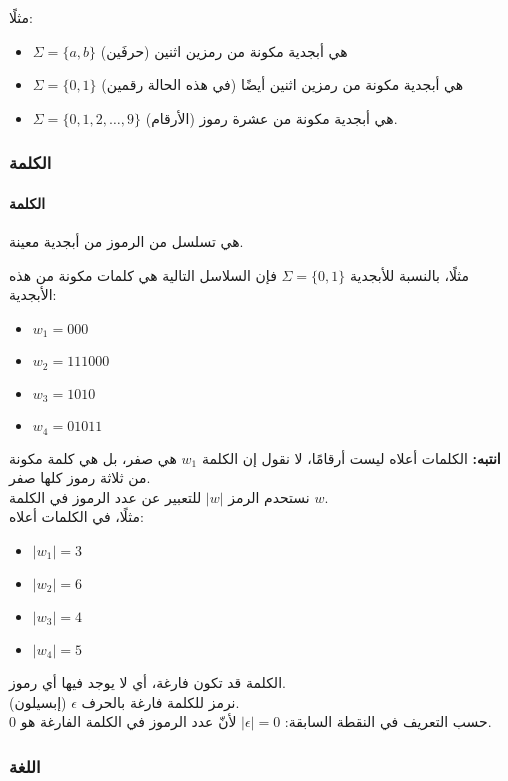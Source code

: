 \documentclass[12pt]{article}
\begin{document}
مثلًا:
\begin{itemize}
    \item $\Sigma = \{a, b\}$ هي أبجدية مكونة من رمزين اثنين (حرفَين)
    \item $\Sigma = \{0, 1\}$ هي أبجدية مكونة من رمزين اثنين أيضًا (في هذه الحالة رقمين)
    \item $\Sigma = \{0, 1, 2, \dots, 9\}$ هي أبجدية مكونة من عشرة رموز (الأرقام).
\end{itemize}


\subsubsection{الكلمة}

\paragraph{الكلمة} هي تسلسل من الرموز من أبجدية معينة.

مثلًا، بالنسبة للأبجدية $\Sigma = \{0, 1\}$ فإن السلاسل التالية هي كلمات مكونة من هذه الأبجدية:
\begin{itemize}
    \item $w_1 = 000$
    \item $w_2 = 111000$
    \item $w_3 = 1010$
    \item $w_4 = 01011$
\end{itemize}

\textbf{انتبه:} الكلمات أعلاه ليست أرقامًا، لا نقول إن الكلمة $w_1$ هي صفر، بل هي كلمة مكونة من ثلاثة رموز كلها صفر. \\
نستحدم الرمز $|w|$ للتعبير عن عدد الرموز في الكلمة $w$. \\
مثلًا، في الكلمات أعلاه:
\begin{itemize}
    \item $|w_1| = 3$
    \item $|w_2| = 6$
    \item $|w_3| = 4$
    \item $|w_4| = 5$
\end{itemize}

الكلمة قد تكون فارغة، أي لا يوجد فيها أي رموز. \\
نرمز للكلمة فارغة بالحرف $\epsilon$ (إبسيلون). \\
حسب التعريف في النقطة السابقة: $|\epsilon| = 0$ لأنّ عدد الرموز في الكلمة الفارغة هو 0.


\subsubsection{اللغة}
\end{document}
